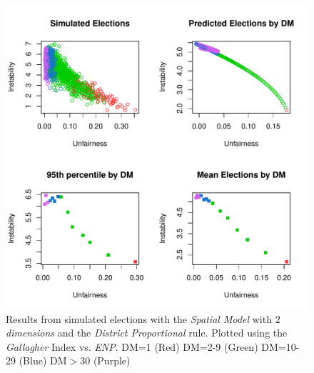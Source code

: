 \documentclass{article}
\begin{document}
\begin{figure}[]
\includegraphics[scale=1.00]{images/pd_spatial2_gallagher_enp.pdf}
\caption{Results from simulated elections with the \emph{Spatial Model} with \emph{$2$ dimensions} and the \emph{District Proportional} rule. Plotted using the \emph{Gallagher} Index vs. \emph{ENP}. DM=1 (Red) DM=2-9 (Green) DM=10-29 (Blue) DM$>$30 (Purple)}
\label{fig:pd_spatial2}
\end{figure}
\end{document}
